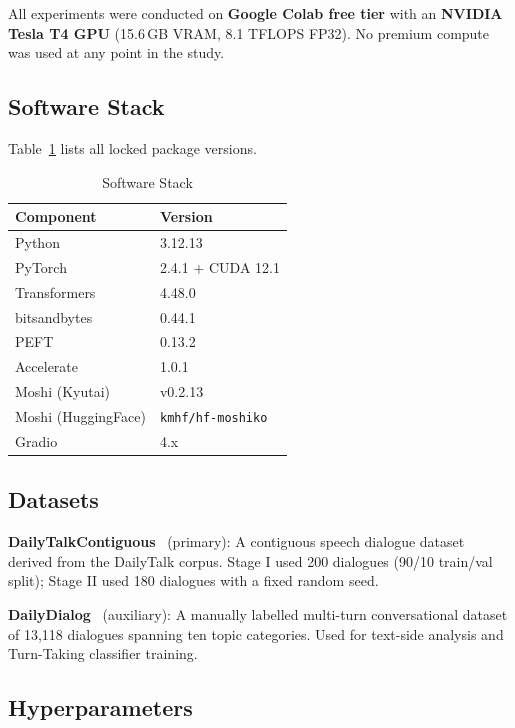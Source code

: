 \documentclass[conference]{IEEEtran}
\begin{document}
All experiments were conducted on \textbf{Google Colab free tier} with an
\textbf{NVIDIA Tesla T4 GPU} (15.6\,GB VRAM, 8.1 TFLOPS FP32).
No premium compute was used at any point in the study.

\subsection{Software Stack}

Table~\ref{tab:software} lists all locked package versions.

\begin{table}[t]
\caption{Software Stack}
\label{tab:software}
\centering
\small
\begin{tabular}{@{}ll@{}}
\toprule
\textbf{Component} & \textbf{Version} \\
\midrule
Python & 3.12.13 \\
PyTorch & 2.4.1 + CUDA 12.1 \\
Transformers & 4.48.0 \\
bitsandbytes & 0.44.1 \\
PEFT & 0.13.2 \\
Accelerate & 1.0.1 \\
Moshi (Kyutai) & v0.2.13 \\
Moshi (HuggingFace) & \texttt{kmhf/hf-moshiko} \\
Gradio & 4.x \\
\bottomrule
\end{tabular}
\end{table}

\subsection{Datasets}

\textbf{DailyTalkContiguous}~\cite{lee2023dailytalk} (primary):
A contiguous speech dialogue dataset derived from the DailyTalk corpus.
Stage I used 200 dialogues (90/10 train/val split); Stage II used 180 dialogues
with a fixed random seed.

\textbf{DailyDialog}~\cite{li2017dailydialog} (auxiliary):
A manually labelled multi-turn conversational dataset of 13,118 dialogues
spanning ten topic categories.
Used for text-side analysis and Turn-Taking classifier training.

\subsection{Hyperparameters}
\end{document}
